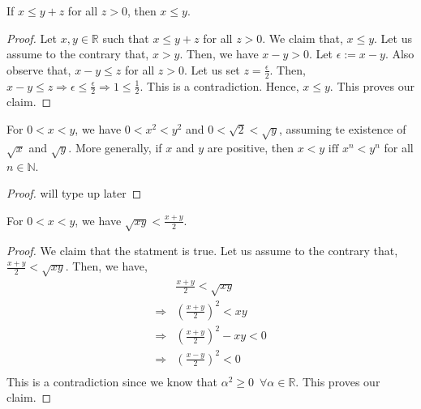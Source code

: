 \documentclass{scrartcl}
\newcommand{\rn}{\mathbb{R}}
\newcommand{\nn}{\mathbb{N}}
\begin{document}
    \begin{example}
        If $x \leq y + z$ for all $z > 0$, then $x \leq y$.
        \begin{proof}
            Let $x,y \in \rn$ such that $x \leq y + z$ for all $z > 0$. We claim that, $x \leq y$. Let us assume to the contrary that, $x > y$. Then, we have $x - y > 0$. Let $\epsilon := x - y$. Also observe that, $x-y \leq z$ for all $z > 0$. Let us set $z = \frac{\epsilon}{2}$. Then, $x - y \leq z \Rightarrow \epsilon \leq \frac{\epsilon}{2} \Rightarrow 1 \leq \frac{1}{2}$. This is a contradiction. Hence, $x \leq y$. This proves our claim.
        \end{proof}
    \end{example}
    \begin{example}
        For $0 < x < y$, we have $0<x^2<y^2$ and $0<\sqrt{2}<\sqrt{y}$, assuming te existence of $\sqrt{x}$ and $\sqrt{y}$. More generally, if $x$ and $y$ are positive, then $x < y \text{ iff } x^n < y^n$ for all $n \in \nn$.
		\begin{proof}
            will type up later
		\end{proof}
    \end{example}
    \begin{example}
        For $0 < x < y$, we have $\sqrt{xy} < \frac{x + y}{2}$.
        \begin{proof}
            We claim that the statment is true. Let us assume to the contrary that, $\frac{x + y}{2} < \sqrt{xy}$. Then, we have, 
            \begin{align*}
			    &\frac{x + y}{2} < \sqrt{xy} \\
			    \Rightarrow &\left(\frac{x + y}{2}\right)^2 < xy \tag{Example 1}\\
			    \Rightarrow &\left(\frac{x + y}{2}\right)^2 - xy < 0 \\
			    \Rightarrow &\left(\frac{x - y}{2}\right)^2 < 0 \\
		    \end{align*}
		    This is a contradiction since we know that $\alpha^2 \geq 0 \,\,\, \forall \alpha \in \rn$. This proves our claim.
        \end{proof}
    \end{example}
\end{document}

